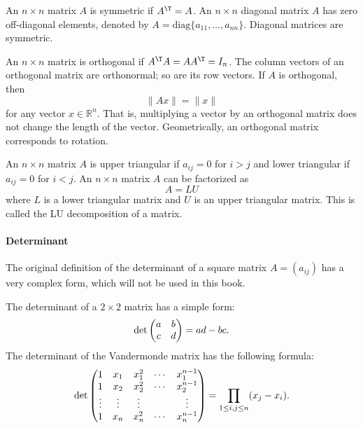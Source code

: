 An $n\times n$ matrix $A$ is symmetric if $A^{\T}=A$. 
An $n\times n$ diagonal matrix $A$ has zero off-diagonal elements,
denoted by $A=\text{diag}\{a_{11},\ldots,a_{nn}\}.$
Diagonal matrices are symmetric. 

An $n\times n$
matrix is orthogonal if $A^{\T}A=AA^{\T}=I_{n}$. The column vectors of an orthogonal matrix are orthonormal; so are its row vectors. If $A$ is orthogonal, then 
$$
\| A x \|  = \|x\|
$$
for any vector $x\in \mathbb{R}^n$. That is, multiplying a vector by an orthogonal matrix does not change the length of the vector. Geometrically, an orthogonal matrix corresponds to rotation. 




An $n\times n$ matrix $A$ is upper triangular if $a_{ij} = 0$ for $i > j$ and lower triangular if $a_{ij} = 0$ for $i < j$. An $n\times n$ matrix $A$ can be factorized as
$$
A = LU
$$
where $L$ is a lower triangular matrix and $U$ is an upper triangular matrix. This is called the LU decomposition of a matrix. 



\paragraph*{Determinant}

The original definition of the determinant of a square matrix $A = (a_{ij})$ has a very complex form, which will not be used in this book. 



The determinant of a $2\times 2$ matrix has a simple form:
\begin{equation}\label{eq::det-2X2}
\textup{det}\begin{pmatrix}
a & b \\
c& d
\end{pmatrix}
= ad - bc.
\end{equation}
The determinant of the Vandermonde matrix has the following formula:
\begin{equation}
\label{eq::det-Vandermonde}
\textup{det}\begin{pmatrix}
1& x_1 & x_1^2 & \cdots & x_1^{n-1} \\
1& x_2 & x_2^2 & \cdots & x_2^{n-1} \\
\vdots & \vdots & \vdots & & \vdots \\
1&x_n & x_n^2 & \cdots & x_n^{n-1}
\end{pmatrix} 
= \prod_{1\leq i, j \leq n} (x_j - x_i).
\end{equation}



